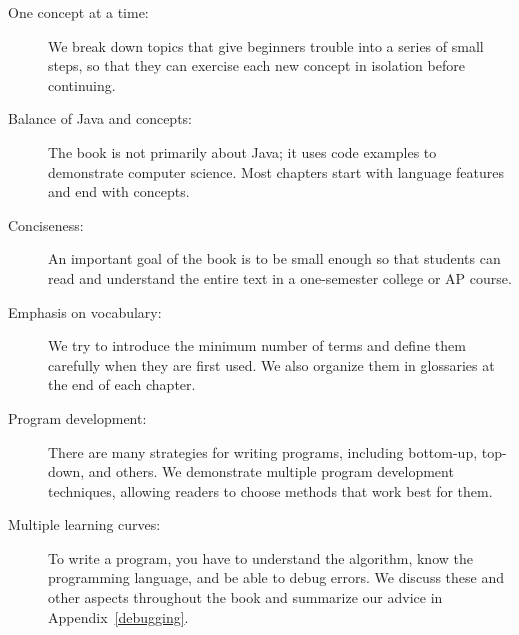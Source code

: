 \begin{description}

\item[One concept at a time:]
We break down topics that give beginners trouble into a series of small steps, so that they can exercise each new concept in isolation before continuing.

\item[Balance of Java and concepts:]
The book is not primarily about Java; it uses code examples to demonstrate computer science.
Most chapters start with language features and end with concepts.

\item[Conciseness:]
An important goal of the book is to be small enough so that students can read and understand the entire text in a one-semester college or AP course.

\item[Emphasis on vocabulary:]
We try to introduce the minimum number of terms and define them carefully when they are first used.
We also organize them in glossaries at the end of each chapter.

\item[Program development:]
There are many strategies for writing programs, including bottom-up, top-down, and others.
We demonstrate multiple program development techniques, allowing readers to choose methods that work best for them.

\item[Multiple learning curves:]
To write a program, you have to understand the algorithm, know the programming language, and be able to debug errors.
We discuss these and other aspects throughout the book and summarize our advice in Appendix~\ref{debugging}.



\end{description}


